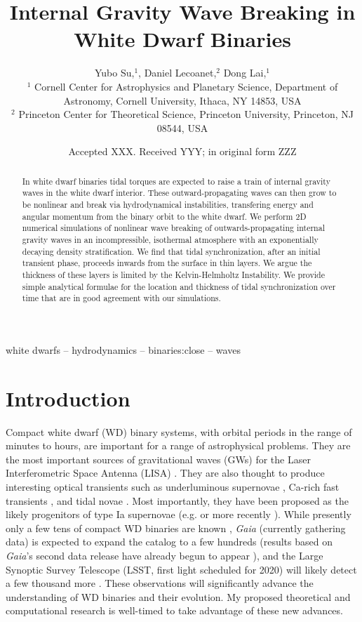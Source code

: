 \documentclass[
        fleqn,
        usenatbib,
    ]{mnras}
\title[Internal Gravity Wave Breaking in White Dwarf Binaries]{Internal Gravity Wave Breaking in White Dwarf Binaries}
\author[Y. Su et\ al.]{
Yubo Su,$^1$,
Daniel Lecoanet,$^2$
Dong Lai,$^1$
\\
$^1$ Cornell Center for Astrophysics and Planetary Science, Department of
Astronomy, Cornell University, Ithaca, NY 14853, USA
\\
$^2$ Princeton Center for Theoretical Science, Princeton University, Princeton,
NJ 08544, USA
}
\date{Accepted XXX\@. Received YYY\@; in original form ZZZ}
\begin{document}
\label{firstpage}
\pagerange{\pageref{firstpage}--\pageref{lastpage}}
\renewcommand*{\sectionautorefname}{Section}
\maketitle

\begin{abstract}
    In white dwarf binaries tidal torques are expected to raise a train of
    internal gravity waves in the white dwarf interior. These
    outward-propagating waves can then grow to be nonlinear and break via
    hydrodynamical instabilities, transfering energy and angular momentum from
    the binary orbit to the white dwarf. We perform 2D numerical simulations of
    nonlinear wave breaking of outwards-propagating internal gravity waves in an
    incompressible, isothermal atmosphere with an exponentially decaying density
    stratification. We find that tidal synchronization, after an initial
    transient phase, proceeds inwards from the surface in thin layers. We argue
    the thickness of these layers is limited by the Kelvin-Helmholtz
    Instability. We provide simple analytical formulae for the location and
    thickness of tidal synchronization over time that are in good agreement with
    our simulations.
\end{abstract}

\begin{keywords}
white dwarfs -- hydrodynamics -- binaries:close -- waves %
\end{keywords}

\section{Introduction}

Compact white dwarf (WD) binary systems, with orbital periods in the range of
minutes to hours, are important for a range of astrophysical problems. They are
the most important sources of gravitational waves (GWs) for the Laser
Interferometric Space Antenna (LISA) \citep{lisa}. They are also thought to
produce interesting optical transients such as underluminous
supernovae \citep{underlum}, Ca-rich fast transients \citep{carich}, and tidal
novae \citep{tidal_novae}. Most importantly, they have been proposed as the likely
progenitors of type Ia supernovae (e.g. \citep{Ia0,webbink} or more
recently \citep{Ia1,Ia2}). While presently only a few tens of compact WD binaries
are known \citep{lsst_wd}, \emph{Gaia} (currently gathering data) is expected to
expand the catalog to a few hundreds \citep{lsst_wd} (results based on
\emph{Gaia}'s second data release have already begun to
appear \citep{gaiaDD,gaiaDD2}), and the Large Synoptic Survey Telescope (LSST,
first light scheduled for 2020) will likely detect a few thousand
more \citep{lsst_wd}. These observations will significantly advance the
understanding of WD binaries and their evolution. My proposed theoretical and
computational research is well-timed to take advantage of these new advances.
\end{document}
